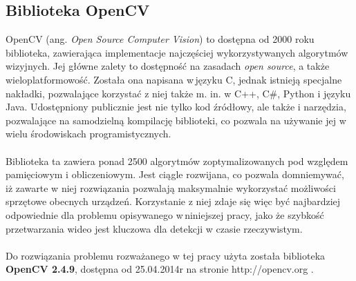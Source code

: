 \subsection{Biblioteka OpenCV}

OpenCV (ang. \textit{Open Source Computer Vision}) to dostępna od 2000 roku biblioteka, zawierająca implementacje najczęściej wykorzystywanych algorytmów wizyjnych. Jej główne zalety to dostępność na zasadach \textit{open source}, a także wieloplatformowość. Została ona napisana w\,języku C, jednak istnieją specjalne nakładki, pozwalające korzystać z niej także m. in. w C++, C\#, Python i języku Java. Udostępniony publicznie jest nie tylko kod źródłowy, ale także i narzędzia, pozwalające na samodzielną kompilację biblioteki, co pozwala na używanie jej w wielu środowiskach programistycznych.
\paragraph{}
Biblioteka ta zawiera ponad 2500 algorytmów zoptymalizowanych pod względem pamięciowym i obliczeniowym. Jest ciągle rozwijana, co pozwala domniemywać, iż zawarte w niej rozwiązania pozwalają maksymalnie wykorzystać możliwości sprzętowe obecnych urządzeń. Korzystanie z niej zdaje się więc być najbardziej odpowiednie dla problemu opisywanego w\,niniejszej pracy, jako że szybkość przetwarzania wideo jest kluczowa dla detekcji w czasie rzeczywistym.
\paragraph{}
Do rozwiązania problemu rozważanego w tej pracy użyta została biblioteka \textbf{OpenCV 2.4.9}, dostępna od 25.04.2014r na stronie http://opencv.org%
.